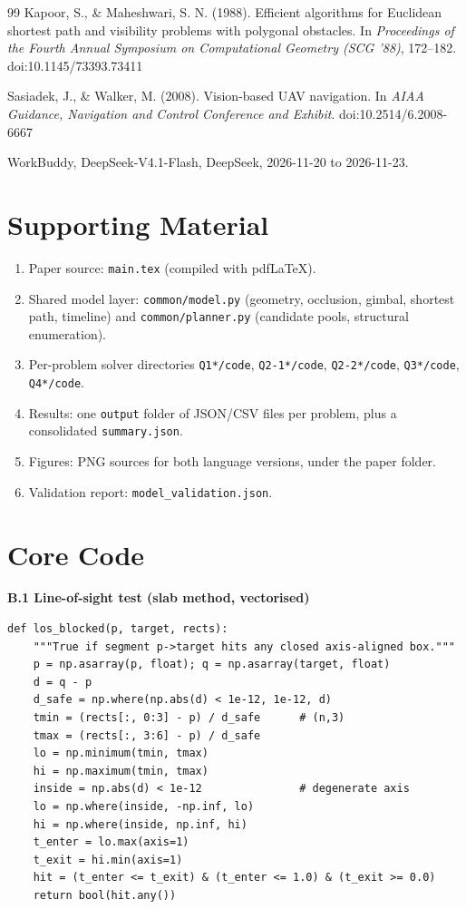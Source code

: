 \documentclass[12pt]{article}
\begin{document}
\begin{thebibliography}{99}
Kapoor, S., \& Maheshwari, S. N. (1988). Efficient algorithms for Euclidean shortest path and visibility problems with polygonal obstacles. In \emph{Proceedings of the Fourth Annual Symposium on Computational Geometry (SCG '88)}, 172--182. doi:10.1145/73393.73411

Sasiadek, J., \& Walker, M. (2008). Vision-based UAV navigation. In \emph{AIAA Guidance, Navigation and Control Conference and Exhibit}. doi:10.2514/6.2008-6667

 WorkBuddy, DeepSeek-V4.1-Flash, DeepSeek, 2026-11-20 to 2026-11-23.
\end{thebibliography}

\newpage
\appendix
\section{Supporting Material}
\sloppy
\begin{enumerate}[leftmargin=2em]
  \item Paper source: \texttt{main.tex} (compiled with pdf\LaTeX).
  \item Shared model layer: \texttt{common/model.py} (geometry, occlusion, gimbal, shortest path, timeline) and \texttt{common/planner.py} (candidate pools, structural enumeration).
  \item Per-problem solver directories \texttt{Q1*/code}, \texttt{Q2-1*/code}, \texttt{Q2-2*/code}, \texttt{Q3*/code}, \texttt{Q4*/code}.
  \item Results: one \texttt{output} folder of JSON/CSV files per problem, plus a consolidated \texttt{summary.json}.
  \item Figures: PNG sources for both language versions, under the paper folder.
  \item Validation report: \texttt{model\_validation.json}.
\end{enumerate}

\section{Core Code}

\noindent\textbf{B.1 Line-of-sight test (slab method, vectorised)}
\begin{lstlisting}
def los_blocked(p, target, rects):
    """True if segment p->target hits any closed axis-aligned box."""
    p = np.asarray(p, float); q = np.asarray(target, float)
    d = q - p
    d_safe = np.where(np.abs(d) < 1e-12, 1e-12, d)
    tmin = (rects[:, 0:3] - p) / d_safe      # (n,3)
    tmax = (rects[:, 3:6] - p) / d_safe
    lo = np.minimum(tmin, tmax)
    hi = np.maximum(tmin, tmax)
    inside = np.abs(d) < 1e-12               # degenerate axis
    lo = np.where(inside, -np.inf, lo)
    hi = np.where(inside, np.inf, hi)
    t_enter = lo.max(axis=1)
    t_exit = hi.min(axis=1)
    hit = (t_enter <= t_exit) & (t_enter <= 1.0) & (t_exit >= 0.0)
    return bool(hit.any())
\end{lstlisting}
\end{document}
